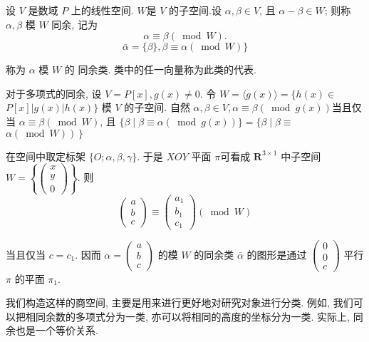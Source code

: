 \documentclass{ctexart}
\begin{document}
\begin{definition}[商空间]
设 $V$ 是数域 $P$ 上的线性空间. $W$是 $V$ 的子空间.设 $\alpha, \beta \in V$, 且 $\alpha-\beta \in W$; 则称 $\alpha, \beta$ 模 $W$ 同余, 记为
$$
\alpha \equiv \beta(\bmod W) .
$$
$$
\bar{\alpha}=\{\beta\}, \beta \equiv \alpha(\bmod W)\}
$$

称为 $\alpha$ 模 $W$ 的 同余类. 类中的任一向量称为此类的代表.
\end{definition}

\begin{example}[多项式同余]
    对于多项式的同余, 
    设 $V={P}[x], g(x) \neq 0$. 令 $W=\langle g(x)\rangle=\{h(x) \in$ ${P}[x]|g(x)| h(x)\}$ 模 $V$ 的子空间. 自然 $\alpha, \beta \in V, \alpha \equiv \beta(\bmod g(x))$当且仅当 $\alpha \equiv \beta\left(\bmod W\right)$, 且 $\{\beta \mid \beta \equiv \alpha(\bmod g(x))\}=\{\beta \mid \beta \equiv$ $\left.\left.\alpha(\bmod W)\right)\right\}$
\end{example}

\begin{example}[空间坐标的同余]
    在空间中取定标架 $\{O ; \alpha, \beta, \gamma\}$. 于是 $X O Y$ 平面 $\pi$可看成 $\mathbf{R}^{3 \times 1}$ 中子空间 $W=\left\{\left(\begin{array}{l}x \\ y \\ 0\end{array}\right)\right\}$. 则
$$
\left(\begin{array}{l}
a \\
b \\
c
\end{array}\right) \equiv\left(\begin{array}{l}
a_1 \\
b_1 \\
c_1
\end{array}\right)(\bmod W)
$$

当且仅当 $c=c_1$. 因而 $\alpha=\left(\begin{array}{l}a \\ b \\ c\end{array}\right)$ 的模 $W$ 的同余类 $\bar{\alpha}$ 的图形是通过 $\left(\begin{array}{l}0 \\ 0 \\ c\end{array}\right)$ 平行 $\pi$ 的平面 $\pi_1$.
\end{example}

我们构造这样的商空间, 主要是用来进行更好地对研究对象进行分类. 例如, 我们可以把相同余数的多项式分为一类, 亦可以将相同的高度的坐标分为一类. 实际上, 同余也是一个等价关系. 
\end{document}
